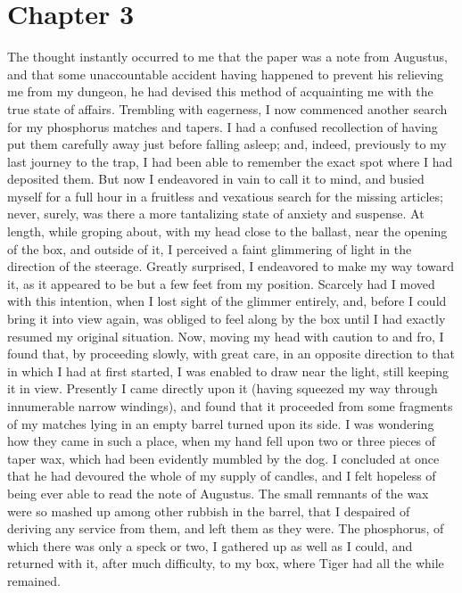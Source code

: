 \section{Chapter 3}
The thought instantly occurred to me that the paper was a note from Augustus,
and that some unaccountable accident having happened to prevent his relieving me
from my dungeon, he had devised this method of acquainting me with the true
state of affairs. Trembling with eagerness, I now commenced another search for
my phosphorus matches and tapers. I had a confused recollection of having put
them carefully away just before falling asleep; and, indeed, previously to my
last journey to the trap, I had been able to remember the exact spot where I had
deposited them. But now I endeavored in vain to call it to mind, and busied
myself for a full hour in a fruitless and vexatious search for the missing
articles; never, surely, was there a more tantalizing state of anxiety and
suspense. At length, while groping about, with my head close to the ballast,
near the opening of the box, and outside of it, I perceived a faint glimmering
of light in the direction of the steerage. Greatly surprised, I endeavored to
make my way toward it, as it appeared to be but a few feet from my position.
Scarcely had I moved with this intention, when I lost sight of the glimmer
entirely, and, before I could bring it into view again, was obliged to feel
along by the box until I had exactly resumed my original situation. Now, moving
my head with caution to and fro, I found that, by proceeding slowly, with great
care, in an opposite direction to that in which I had at first started, I was
enabled to draw near the light, still keeping it in view. Presently I came
directly upon it (having squeezed my way through innumerable narrow windings),
and found that it proceeded from some fragments of my matches lying in an empty
barrel turned upon its side. I was wondering how they came in such a place, when
my hand fell upon two or three pieces of taper wax, which had been evidently
mumbled by the dog. I concluded at once that he had devoured the whole of my
supply of candles, and I felt hopeless of being ever able to read the note of
Augustus. The small remnants of the wax were so mashed up among other rubbish in
the barrel, that I despaired of deriving any service from them, and left them as
they were. The phosphorus, of which there was only a speck or two, I gathered up
as well as I could, and returned with it, after much difficulty, to my box,
where Tiger had all the while remained. 

